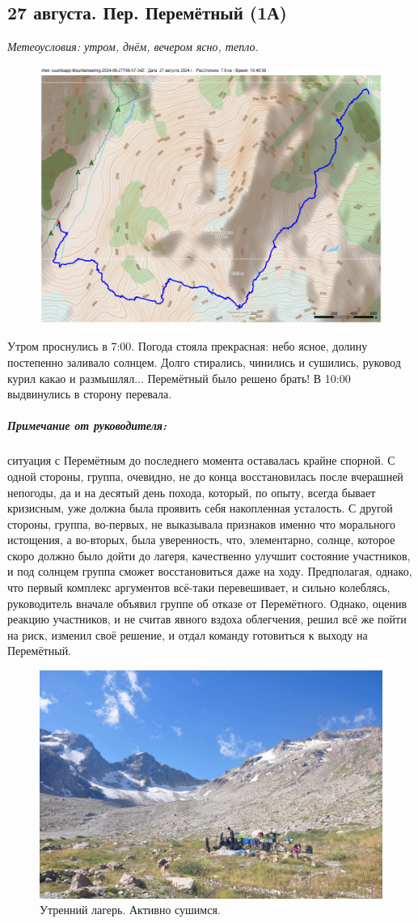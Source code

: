 \subsection{27 августа. Пер. Перемётный (1А)}
\textit{Метеоусловия: утром, днём, вечером ясно, тепло.}
\begin{figure}[h!]
	\centering
	\includegraphics[angle=0, width=0.7\linewidth]{../pics/mini_maps/27}
	\label{fig:mini_27}
\end{figure}

Утром проснулись в 7:00. Погода стояла прекрасная: небо ясное, долину постепенно заливало солнцем. Долго стирались, чинились и сушились, руковод курил какао и размышлял... Перемётный было решено брать!
В 10:00 выдвинулись в сторону перевала. 

\subparagraph{Примечание от руководителя:} ситуация с Перемётным до последнего момента оставалась крайне спорной. С одной стороны, группа, очевидно, не до конца восстановилась после вчерашней непогоды, да и на десятый день похода, который, по опыту, всегда бывает кризисным, уже должна была проявить себя накопленная усталость. С другой стороны, группа, во-первых, не выказывала признаков именно что морального истощения, а во-вторых, была уверенность, что, элементарно, солнце, которое скоро должно было дойти до лагеря, качественно улучшит состояние участников, и под солнцем группа сможет восстановиться даже на ходу. Предполагая, однако, что первый комплекс аргументов всё-таки перевешивает, и сильно колеблясь, руководитель вначале объявил группе об отказе от Перемётного. Однако, оценив реакцию участников, и не считав явного вздоха облегчения, решил всё же пойти на риск, изменил своё решение, и отдал команду готовиться к выходу на Перемётный.
\begin{figure}[h!]
	\centering
	\includegraphics[width=0.7\linewidth]{../pics/DSC_0251.jpg}
	\caption{Утренний лагерь. Активно сушимся.}
	\label{fig:DSC_0251}
\end{figure}


